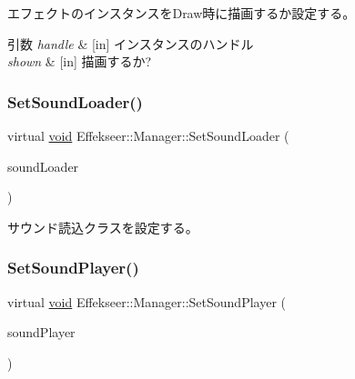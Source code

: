 エフェクトのインスタンスを\+Draw時に描画するか設定する。 


\begin{DoxyParams}{引数}
{\em handle} & \mbox{[}in\mbox{]} インスタンスのハンドル \\
\hline
{\em shown} & \mbox{[}in\mbox{]} 描画するか? \\
\hline
\end{DoxyParams}
\mbox{\label{class_effekseer_1_1_manager_afc9015a7a866accf73ab3b295bff8e06}} 
\subsubsection{\texorpdfstring{Set\+Sound\+Loader()}{SetSoundLoader()}}
{\footnotesize\ttfamily virtual \mbox{\hyperlink{namespace_effekseer_ab34c4088e512200cf4c2716f168deb56}{void}} Effekseer\+::\+Manager\+::\+Set\+Sound\+Loader (\begin{DoxyParamCaption}\item[{\mbox{\hyperlink{class_effekseer_1_1_sound_loader}{Sound\+Loader}} $\ast$}]{sound\+Loader }\end{DoxyParamCaption})\hspace{0.3cm}{\ttfamily [pure virtual]}}



サウンド読込クラスを設定する。 

\mbox{\label{class_effekseer_1_1_manager_af08602f559cd1f75bcaacfd8b1ec0840}} 
\subsubsection{\texorpdfstring{Set\+Sound\+Player()}{SetSoundPlayer()}}
{\footnotesize\ttfamily virtual \mbox{\hyperlink{namespace_effekseer_ab34c4088e512200cf4c2716f168deb56}{void}} Effekseer\+::\+Manager\+::\+Set\+Sound\+Player (\begin{DoxyParamCaption}\item[{\mbox{\hyperlink{class_effekseer_1_1_sound_player}{Sound\+Player}} $\ast$}]{sound\+Player }\end{DoxyParamCaption})\hspace{0.3cm}{\ttfamily [pure virtual]}}



